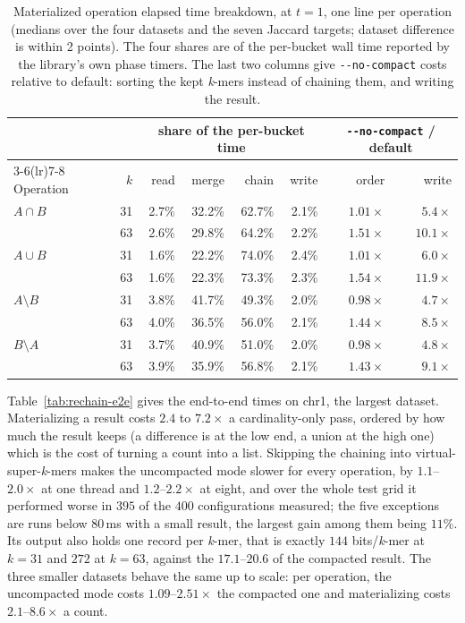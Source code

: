 \documentclass[runningheads,a4paper]{llncs}
\newcommand{\kmer}{\emph{k}-mer\xspace}
\newcommand{\kmers}{\emph{k}-mers\xspace}
\newcommand{\vskmers}{virtual-super-\emph{k}-mers\xspace}
\newif\ifrevmarkup\revmarkupfalse
\newcommand{\rev}[1]{\ifrevmarkup\textcolor{blue}{#1}\else#1\fi}
\newenvironment{revblock}{\ifrevmarkup\color{blue}\fi}{}
\begin{document}
\begin{revblock}
\begin{table}[h]
\centering
\caption{\rev{Materialized operation elapsed time breakdown, at $t=1$, one line per operation (medians over the four datasets and the seven Jaccard targets; dataset difference is within 2 points). The four shares are of the per-bucket wall time reported by the library's own phase timers. The last two columns give \texttt{-{}-no-compact} costs relative to default: sorting the kept \kmers instead of chaining them, and writing the result.}}
\label{tab:rechain-phases}
\small
\setlength{\tabcolsep}{5pt}
\begin{revblock}
\begin{tabular}{lrrrrrrr}
\toprule
 & & \multicolumn{4}{c}{share of the per-bucket time} & \multicolumn{2}{c}{\texttt{-{}-no-compact} / default} \\
\cmidrule(lr){3-6}\cmidrule(lr){7-8}
Operation & $k$ & read & merge & chain & write & order & write \\
\midrule
$A\cap B$        & 31 & 2.7\% & 32.2\% & 62.7\% & 2.1\% & $1.01\times$ & $5.4\times$ \\
                 & 63 & 2.6\% & 29.8\% & 64.2\% & 2.2\% & $1.51\times$ & $10.1\times$ \\
$A\cup B$        & 31 & 1.6\% & 22.2\% & 74.0\% & 2.4\% & $1.01\times$ & $6.0\times$ \\
                 & 63 & 1.6\% & 22.3\% & 73.3\% & 2.3\% & $1.54\times$ & $11.9\times$ \\
$A\setminus B$   & 31 & 3.8\% & 41.7\% & 49.3\% & 2.0\% & $0.98\times$ & $4.7\times$ \\
                 & 63 & 4.0\% & 36.5\% & 56.0\% & 2.1\% & $1.44\times$ & $8.5\times$ \\
$B\setminus A$   & 31 & 3.7\% & 40.9\% & 51.0\% & 2.0\% & $0.98\times$ & $4.8\times$ \\
                 & 63 & 3.9\% & 35.9\% & 56.8\% & 2.1\% & $1.43\times$ & $9.1\times$ \\
\bottomrule
\end{tabular}
\end{revblock}
\end{table}

Table~\ref{tab:rechain-e2e} gives the end-to-end times on chr1, the largest dataset. Materializing a result costs $2.4$ to $7.2\times$ a cardinality-only pass, ordered by how much the result keeps (a difference is at the low end, a union at the high one) which is the cost of turning a count into a list. Skipping the chaining into \vskmers makes the uncompacted mode slower for every operation, by $1.1$--$2.0\times$ at one thread and $1.2$--$2.2\times$ at eight, and over the whole test grid it performed worse in $395$ of the $400$ configurations measured; the five exceptions are runs below $80$\,ms with a small result, the largest gain among them being $11\%$. Its output also holds one record per \kmer, that is exactly $144$ bits/\kmer at $k=31$ and $272$ at $k=63$, against the $17.1$--$20.6$ of the compacted result. The three smaller datasets behave the same up to scale: per operation, the uncompacted mode costs $1.09$--$2.51\times$ the compacted one and materializing costs $2.1$--$8.6\times$ a count.


\end{revblock}
\end{document}
